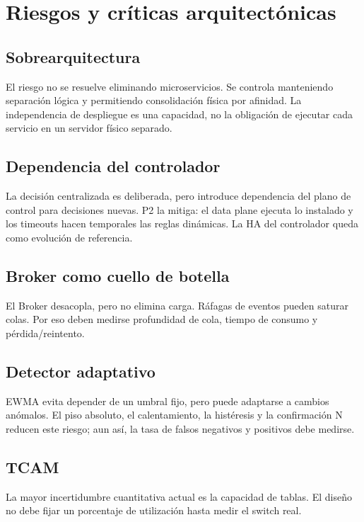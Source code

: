 \documentclass[11pt,a4paper]{article}
\begin{document}
\section{Riesgos y críticas arquitectónicas}

\subsection{Sobrearquitectura}

El riesgo no se resuelve eliminando microservicios. Se controla manteniendo separación lógica y permitiendo consolidación física por afinidad. La independencia de despliegue es una capacidad, no la obligación de ejecutar cada servicio en un servidor físico separado.

\subsection{Dependencia del controlador}

La decisión centralizada es deliberada, pero introduce dependencia del plano de control para decisiones nuevas. P2 la mitiga: el data plane ejecuta lo instalado y los timeouts hacen temporales las reglas dinámicas. La HA del controlador queda como evolución de referencia.

\subsection{Broker como cuello de botella}

El Broker desacopla, pero no elimina carga. Ráfagas de eventos pueden saturar colas. Por eso deben medirse profundidad de cola, tiempo de consumo y pérdida/reintento.

\subsection{Detector adaptativo}

EWMA evita depender de un umbral fijo, pero puede adaptarse a cambios anómalos. El piso absoluto, el calentamiento, la histéresis y la confirmación N reducen este riesgo; aun así, la tasa de falsos negativos y positivos debe medirse.

\subsection{TCAM}

La mayor incertidumbre cuantitativa actual es la capacidad de tablas. El diseño no debe fijar un porcentaje de utilización hasta medir el switch real.
\end{document}
